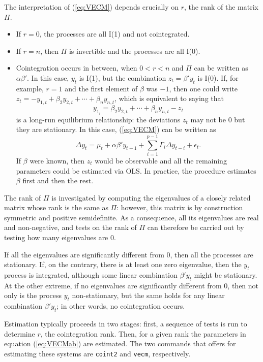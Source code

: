 The interpretation of (\ref{eq:VECM}) depends crucially on $r$, the rank of
the matrix $\Pi$.
\begin{itemize}
\item If $r = 0$, the processes are all I(1) and not cointegrated.
\item If $r = n$, then $\Pi$ is invertible and the processes are all I(0).
\item Cointegration occurs in between, when $0 < r < n$ and $\Pi$ can
  be written as $\alpha \beta'$. In this case, $y_t$ is I(1), but the
  combination $z_t = \beta'y_t$ is I(0). If, for example, $r=1$ and
  the first element of $\beta$ was $-1$, then one could write $z_t =
  -y_{1,t} + \beta_2 y_{2,t} + \cdots + \beta_n y_{n,t}$, which is
  equivalent to saying that
  \[
    y_{1_t} = \beta_2 y_{2,t} + \cdots + \beta_n y_{n,t} - z_t
  \]
  is a long-run equilibrium relationship: the deviations $z_t$
  may not be 0 but they are stationary. In this case, (\ref{eq:VECM})
  can be written as 
  \begin{equation}
    \label{eq:VECMab}
    \Delta y_t = \mu_t + \alpha \beta' y_{t-1} + \sum_{i=1}^{p-1} \Gamma_i 
    \Delta y_{t-i} + \epsilon_t .
  \end{equation}
  If $\beta$ were known, then $z_t$ would be observable and all the
  remaining parameters could be estimated via OLS.  In practice, the
  procedure estimates $\beta$ first and then the rest.
\end{itemize}

The rank of $\Pi$ is investigated by computing the eigenvalues of a
closely related matrix whose rank is the same as $\Pi$: however, this
matrix is by construction symmetric and positive semidefinite.  As a
consequence, all its eigenvalues are real and non-negative, and tests
on the rank of $\Pi$ can therefore be carried out by testing how many
eigenvalues are 0.

If all the eigenvalues are significantly different from 0, then all
the processes are stationary. If, on the contrary, there is at least
one zero eigenvalue, then the $y_t$ process is integrated, although
some linear combination $\beta'y_t$ might be stationary. At the other
extreme, if no eigenvalues are significantly different from 0, then
not only is the process $y_t$ non-stationary, but the same holds for
any linear combination $\beta'y_t$; in other words, no cointegration
occurs.

Estimation typically proceeds in two stages: first, a sequence of
tests is run to determine $r$, the cointegration rank. Then, for a
given rank the parameters in equation (\ref{eq:VECMab}) are estimated.
The two commands that  offers for estimating these systems
are \texttt{coint2} and \texttt{vecm}, respectively. 

